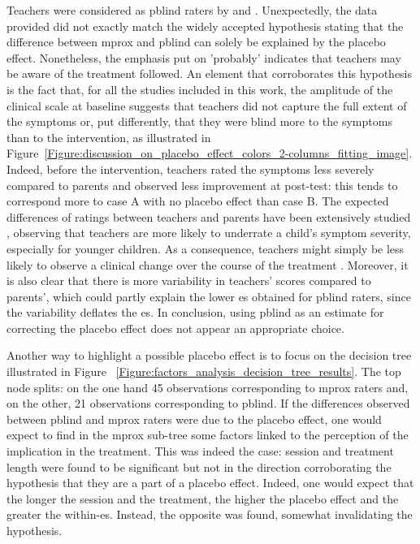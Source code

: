 Teachers were considered as \gls{pblind} raters by \citeauthor{Cortese2016} and \citeauthor{Micoulaud2014}.
Unexpectedly, the data provided did not exactly match the widely accepted hypothesis stating that the difference between
\gls{mprox} and \gls{pblind} can solely be explained by the placebo effect. 
Nonetheless, the emphasis put on 'probably' indicates that teachers may be aware of the treatment followed. 
An element that corroborates this hypothesis is the fact that, for all the studies included in this work, the amplitude 
of the clinical scale at baseline suggests that teachers did not capture the full extent of the symptoms or, put differently, 
that they were blind more to the symptoms than to the intervention, as illustrated 
in Figure~\ref{Figure:discussion_on_placebo_effect_colors_2-columns_fitting_image}. 
Indeed, before the intervention, teachers rated the symptoms less severely compared to parents and observed less improvement at post-test: 
this tends to correspond more to case A with no placebo effect than case B. The expected differences of ratings between 
teachers and parents have been extensively studied \citep{Sollie2013, Narad2015, Minder2018}, observing that teachers are more 
likely to underrate a child's symptom severity, especially for younger children. As a consequence, teachers might simply be less likely 
to observe a clinical change over the course of the treatment \citep{Sollie2013, Narad2015, Minder2018}. Moreover, it is also clear 
that there is more variability in teachers' scores compared to parents', which could partly explain the lower \gls{es} obtained for 
\gls{pblind} raters, since the variability deflates the \gls{es}. In conclusion, using \gls{pblind} as an estimate for correcting the 
placebo effect does not appear an appropriate choice. 

Another way to highlight a possible placebo effect is to focus on the decision tree illustrated in Figure
~\ref{Figure:factors_analysis_decision_tree_results}.
The top node splits: on the one hand 45 observations corresponding to \gls{mprox} raters and, on the other, 
21 observations corresponding to \gls{pblind}. If the differences observed between \gls{pblind} and \gls{mprox} raters were 
due to the placebo effect, one would expect to find in the \gls{mprox} sub-tree some factors linked to the perception
of the implication in the treatment. This was indeed the case: session and treatment length were found to be significant but not in the
direction corroborating the hypothesis that they are a part of a placebo effect. Indeed, one would expect that the
longer the session and the treatment, the higher the placebo effect and the greater the within-\gls{es}. Instead, the opposite was found, 
somewhat invalidating the hypothesis. 

